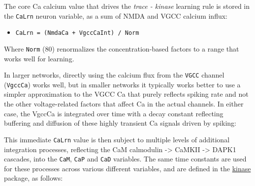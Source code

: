 \documentclass[11pt,twoside]{article}
\newif\myifpdf
\begin{document}
The core Ca calcium value that drives the \emph{trace - kinase} learning
rule is stored in the \texttt{CaLrn} neuron variable, as a sum of NMDA
and VGCC calcium influx:

\begin{itemize}
\tightlist
\item
  \texttt{CaLrn\ =\ (NmdaCa\ +\ VgccCaInt)\ /\ Norm}
\end{itemize}

Where \texttt{Norm} (80) renormalizes the concentration-based factors to
a range that works well for learning.

In larger networks, directly using the calcium flux from the
\texttt{VGCC} channel (\texttt{VgccCa}) works well, but in smaller
networks it typically works better to use a simpler approximation to the
VGCC Ca that purely reflects spiking rate and not the other
voltage-related factors that affect Ca in the actual channels. In either
case, the VgccCa is integrated over time with a decay constant
reflecting buffering and diffusion of these highly transient Ca signals
driven by spiking:

\begin{Shaded}
\begin{Highlighting}[]
    \OperatorTok{\{}
\OperatorTok{=}\OperatorTok{*}
    \OperatorTok{\}}
\OperatorTok{+=}\OperatorTok{{-}}\OperatorTok{/}
\end{Highlighting}
\end{Shaded}

This immediate \texttt{CaLrn} value is then subject to multiple levels
of additional integration processes, reflecting the CaM calmodulin
-\textgreater{} CaMKII -\textgreater{} DAPK1 cascades, into the
\texttt{CaM}, \texttt{CaP} and \texttt{CaD} variables. The same time
constants are used for these processes across various different
variables, and are defined in the
\href{https://github.com/emer/axon/tree/master/kinase}{kinase} package,
as follows:
\end{document}
